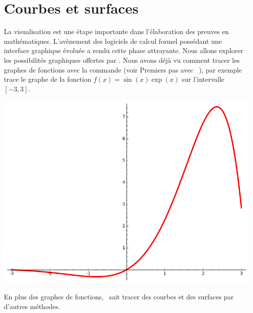 \documentclass[class=report,crop=false]{standalone}
\begin{document}




\setcounter{section}{5}
\section{Courbes et surfaces}

La visualisation est une étape importante dans l'élaboration 
des preuves en mathématiques. L'avènement des logiciels de calcul 
formel possédant une interface graphique évoluée a 
rendu cette phase attrayante. Nous allons explorer 
les possibilités graphiques offertes par \Sage.
Nous avons déjà vu comment tracer les graphes de fonctions avec la commande 
(voir \og Premiers pas avec \Sage\ \fg{}), par exemple 
trace le graphe de la fonction $f(x)=\sin(x)\exp(x)$ sur l'intervalle $[-3,3]$.
\begin{center}
 \includegraphics[scale=0.3]{figures/intro_courbes} 
\end{center}

En plus des graphes de fonctions, \Sage\ sait tracer des courbes et des surfaces par d'autres méthodes.

\end{document}

